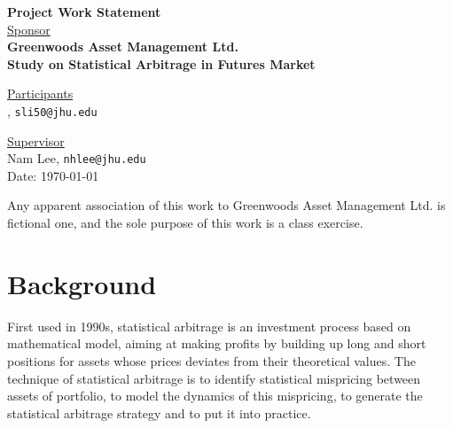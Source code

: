 \documentclass[12pt,letterpaper]{article}
\theoremstyle{definition}
\begin{document}
\def\shiftdowna{0.32in}  %
\def\shiftdownb{0.22in}  %


\begin{center}
\textbf{{\large Project Work Statement}}\\


\vspace \shiftdowna
\underline {Sponsor}\\ 
\vspace{5pt}
\textbf{{\large Greenwoods Asset Management Ltd.}}\\


\vspace \shiftdowna
\textbf{{\large Study on Statistical Arbitrage in Futures Market}}


\vspace{0.35in}
\vspace \shiftdownb
\underline {Participants} \\
\vspace{5pt}
, \texttt{sli50@jhu.edu}

\vspace \shiftdownb
\underline {Supervisor}\\
\vspace{5pt}
Nam Lee, \texttt{nhlee@jhu.edu} \\


\vspace \shiftdowna
Date: \today

\end{center}

\vfill  
\footnoterule
\noindent \small{Any apparent association of this work to Greenwoods Asset Management Ltd. is
fictional one, and the sole purpose of this work is a class exercise.}

\newpage

\section{Background} 
     \noindent First used in 1990s, statistical arbitrage is an investment process based on mathematical model, aiming at making profits by building up long and short positions for assets whose prices deviates from their theoretical values. The technique of statistical arbitrage is to identify statistical mispricing between assets of portfolio, to model the dynamics of this mispricing, to generate the statistical arbitrage strategy and to put it into practice.
\end{document}
